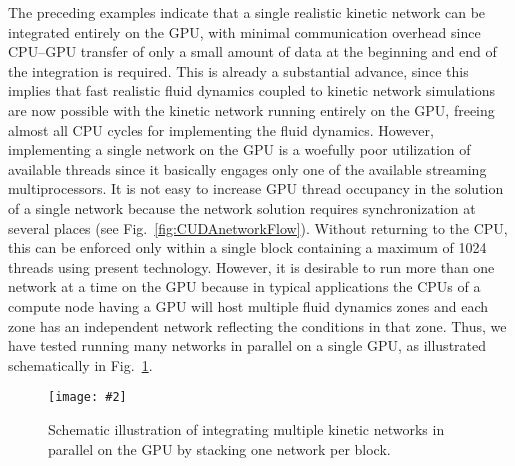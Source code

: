 \documentclass[]{elsart}
\newlength{\figdn}
\newcommand{\fig}[1]{Fig.~\ref{fig:#1}}
\newcommand{\singlefig}[6]{%
\begin{figure} \vspace{#3}%
\begin{flushright}%
\texttt{[image: \#2]}%
\end{flushright}%
\caption{\label{fig:#1} #6}%
\vspace{#4}%
\end{figure}}
\begin{document}
The preceding examples indicate that a single realistic kinetic network can be 
integrated entirely on the GPU, with minimal communication  overhead 
since CPU--GPU transfer of only a small amount of data at the beginning and end 
of the integration is required.  This is already a substantial advance, since 
this implies that fast realistic fluid dynamics coupled to kinetic network 
simulations are now possible with the kinetic network running entirely on the 
GPU, freeing almost all CPU cycles for implementing the fluid dynamics.  
However, implementing a single network on the GPU is a woefully poor utilization 
of available threads since it basically engages only one of the available 
streaming multiprocessors. It is not easy to increase GPU thread occupancy in 
the solution of a single network because the network solution requires 
synchronization at several places (see \fig{CUDAnetworkFlow}).  Without 
returning to the CPU, this can be enforced only within a single block containing 
a maximum of 1024 threads using present technology. However, it is desirable to 
run more than one network at a time on the GPU because in typical applications 
the CPUs of a compute node having a GPU will host multiple fluid dynamics zones 
and each zone  has an independent network reflecting the conditions in that 
zone. Thus, we have tested running many networks in parallel on a single GPU, as 
illustrated schematically in \fig{multipleNetworks}.%
%
%
\singlefig
{multipleNetworks}
{figures/multipleNetworks.eps}
{0pt}
{\figdn}
{0.60}
{Schematic illustration of integrating multiple kinetic networks in parallel on the
GPU by stacking one network per block.}
%
%
\end{document}
